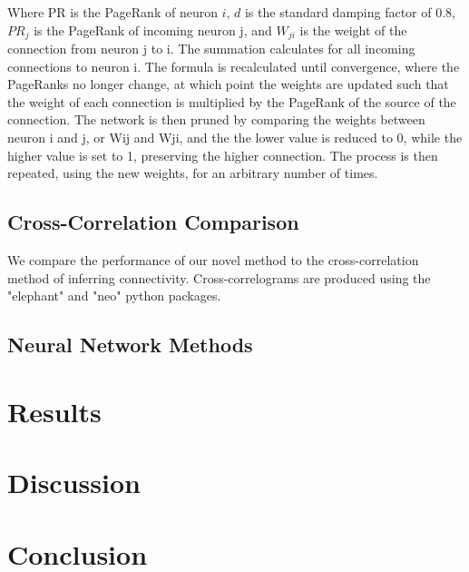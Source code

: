 \documentclass[11pt]{article}
\begin{document}
Where PR is the PageRank of neuron $i$, $d$ is the standard damping factor of 0.8, $PR_j$ is the PageRank of incoming neuron j, and $W_{ji}$ is the weight of the connection from neuron j to i. The summation calculates for all incoming connections to neuron i. The formula is recalculated until convergence, where the PageRanks no longer change, at which point the weights are updated such that the weight of each connection is multiplied by the PageRank of the source of the connection. The network is then pruned by comparing the weights between neuron i and j, or Wij and Wji, and the the lower value is reduced to 0, while the higher value is set to 1, preserving the higher connection. The process is then repeated, using the new weights, for an arbitrary number of times.\par

\subsection{Cross-Correlation Comparison}
We compare the performance of our novel method to the cross-correlation method of inferring connectivity. Cross-correlograms are produced using the "elephant" and "neo" python packages.

\subsection{Neural Network Methods}

\section{Results}

\section{Discussion}

\section{Conclusion}
\end{document}
